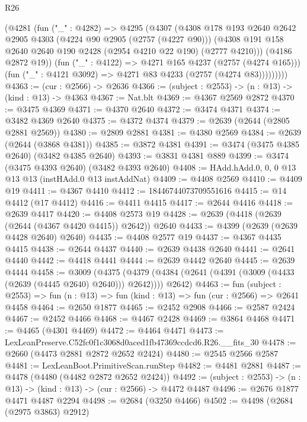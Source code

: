 \begin{lexlean}{R26}
\begin{coremodule}
            (@4281
              (fun ("_" : @4282) =>
              @4295
                (@4307
                  (@4308
                    @178
                    @193
                    @2640
                    @2642
                    @2905
                    @4303
                    (@4224 @90 @2905 (@2757 (@4227 @90)))
                    (@4308 @191 @158 @2640 @2640 @190 @2428 (@2954 @4210 @22 @190) (@2777 @4210)))
                  (@4186 @2872 @19))
                (fun ("_" : @4122) => @4271 @165 @4237 (@2757 (@4274 @165)))
                (fun ("_" : @4121 @3092) => @4271 @83 @4233 (@2757 (@4274 @83)))))))))
@4363 := (cur : @2566) -> @2636
@4366 := (subject : @2553) -> (n : @13) -> (kind : @13) -> @4363
@4367 := Nat.blt
@4369 := @4367 @2569 @2872
@4370 := @3475 @4369
@4371 := @4370 @2640
@4372 := @3474 @4371
@4374 := @3482 @4369 @2640
@4375 := @4372 @4374
@4379 := @2639 (@2644 (@2805 @2881 @2569))
@4380 := @2809 @2881
@4381 := @4380 @2569
@4384 := @2639 (@2644 (@3868 @4381))
@4385 := @3872 @4381
@4391 := @3474 (@3475 @4385 @2640) (@3482 @4385 @2640)
@4393 := @3831 @4381 @889
@4399 := @3474 (@3475 @4393 @2640) (@3482 @4393 @2640)
@4408 := HAdd.hAdd.{0, 0, 0} @13 @13 @13 (instHAdd.{0} @13 instAddNat)
@4409 := @4408 @2569
@4410 := @4409 @19
@4411 := @4367 @4410
@4412 := 18446744073709551616
@4415 := @14 @4412 (@17 @4412)
@4416 := @4411 @4415
@4417 := @2644 @4416
@4418 := @2639 @4417
@4420 := @4408 @2573 @19
@4428 := @2639 (@4418 (@2639 (@2644 (@4367 @4420 @4415)) @2642)) @2640
@4433 := @4399 (@2639 (@2639 @4428 @2640) @2640)
@4435 := @4408 @2577 @19
@4437 := @4367 @4435 @4415
@4438 := @2644 @4437
@4440 := @2639 @4438 @2640
@4441 := @2641 @4440
@4442 := @4418 @4441
@4444 := @2639 @4442 @2640
@4445 := @2639 @4444
@4458 := @3009
    (@4375 (@4379 (@4384 (@2641 (@4391 (@3009 (@4433 (@2639 (@4445 @2640) @2640))) @2642)))) @2642)
@4463 := fun (subject : @2553) =>
  fun (n : @13) => fun (kind : @13) => fun (cur : @2566) => @2641 @4458
@4464 := @2650 @1877
@4465 := @2452 @2908
@4466 := @2587 @2424
@4467 := @2452 @4466
@4468 := @4467 @2428
@4469 := @3864 @4468
@4471 := @4465 (@4301 @4469)
@4472 := @4464 @4471
@4473 := LexLeanPreserve.C52fc0f1c3068d0aced1fb47369ccdcd6.R26.__fits_30
@4478 := @2660 (@4473 @2881 @2872 @2652 @2424)
@4480 := @2545 @2566 @2587
@4481 := LexLeanBoot.PrimitiveScan.runStep
@4482 := @4481 @2881
@4487 := @4478 (@4480 (@4482 @2872 @2652 @2424))
@4492 := (subject : @2553) -> (n : @13) -> (kind : @13) -> (cur : @2566) -> @4472 @4487
@4496 := @2676 @1877 @4471 @4487 @2294
@4498 := @2684 (@3250 @4466)
@4502 := @4498 (@2684 (@2975 @3863) @2912)

\end{coremodule}
\end{lexlean}
